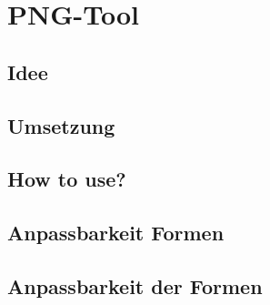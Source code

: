 
\section{PNG-Tool}

\subsection{Idee}

\newpage

\subsection{Umsetzung}

\newpage

\subsection{How to use?}

\newpage

\subsection{Anpassbarkeit Formen}

\newpage

\subsection{Anpassbarkeit der Formen}

\newpage
